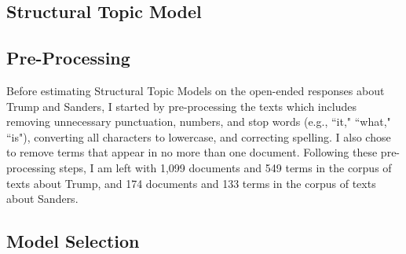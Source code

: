 \documentclass[12pt]{article}
\begin{document}
\begin{appendices}
\begin{refsection}
%	
%	
%	



\doublespacing


\clearpage
\section{Structural Topic Model}\label{app:stm}

\subsection{Pre-Processing}\label{app:preprocessing}
Before estimating Structural Topic Models on the open-ended responses about Trump and Sanders, I started by pre-processing the texts which includes removing unnecessary punctuation, numbers, and stop words (e.g., ``it," ``what," ``is"), converting all characters to lowercase, and correcting spelling. I also chose to remove terms that appear in no more than one document. Following these pre-processing steps, I am left with 1,099 documents and 549 terms in the corpus of texts about Trump, and 174 documents and 133 terms in the corpus of texts about Sanders. 

\subsection{Model Selection}\label{app:modelselection}


\end{refsection}
\end{appendices}
\end{document}
